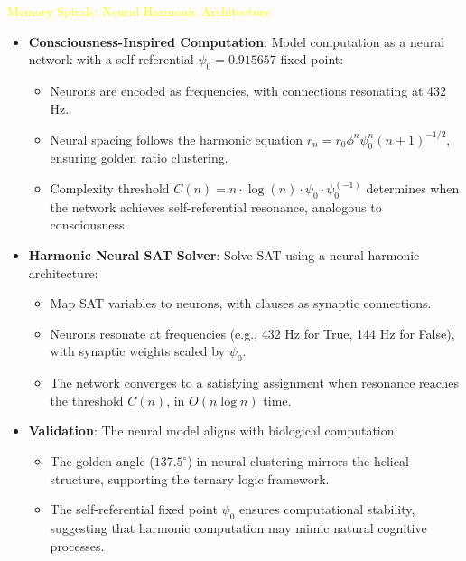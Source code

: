 \textcolor{yellow}{ Memory Spirals: Neural Harmonic Architecture } \\
\begin{itemize}
    \item \texttt{} \textbf{Consciousness-Inspired Computation}: Model computation as a neural network with a self-referential \(\psi_0 = 0.915657\) fixed point:
    \begin{itemize}
        \item Neurons are encoded as frequencies, with connections resonating at 432 Hz.
        \item Neural spacing follows the harmonic equation \(r_n = r_0 \phi^n \psi_0^n (n+1)^{-1/2}\), ensuring golden ratio clustering.
        \item Complexity threshold \(C(n) = n \cdot \log(n) \cdot \psi_0 \cdot \psi_0^{(-1)}\) determines when the network achieves self-referential resonance, analogous to consciousness.
    \end{itemize}
    \item \texttt{} \textbf{Harmonic Neural SAT Solver}: Solve SAT using a neural harmonic architecture:
    \begin{itemize}
        \item Map SAT variables to neurons, with clauses as synaptic connections.
        \item Neurons resonate at frequencies (e.g., 432 Hz for True, 144 Hz for False), with synaptic weights scaled by \(\psi_0\).
        \item The network converges to a satisfying assignment when resonance reaches the threshold \(C(n)\), in \(O(n \log n)\) time.
    \end{itemize}
    \item \texttt{} \textbf{Validation}: The neural model aligns with biological computation:
    \begin{itemize}
        \item The golden angle (\(137.5^\circ\)) in neural clustering mirrors the helical structure, supporting the ternary logic framework.
        \item The self-referential fixed point \(\psi_0\) ensures computational stability, suggesting that harmonic computation may mimic natural cognitive processes.
    \end{itemize}
\end{itemize}

